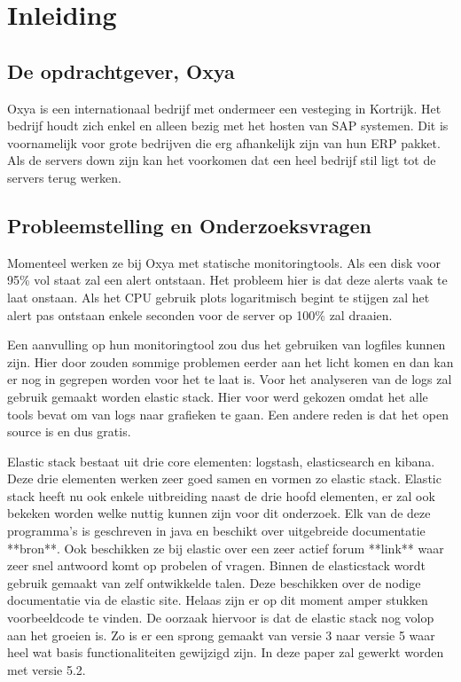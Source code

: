 
\chapter{Inleiding}
\label{ch:inleiding}


\textcite{Knuth1998}
\autocite{Creeger2009}

\section{De opdrachtgever, Oxya}
\label{sec:de-opdrachtgever}

Oxya is een internationaal bedrijf met ondermeer een vesteging in Kortrijk. Het bedrijf houdt zich enkel en alleen bezig met het hosten van SAP systemen. Dit is voornamelijk voor grote bedrijven die erg afhankelijk zijn van hun ERP pakket. Als de servers down zijn kan het voorkomen dat een heel bedrijf stil ligt tot de servers terug werken.

\section{Probleemstelling en Onderzoeksvragen}
\label{sec:onderzoeksvragen}

Momenteel werken ze bij Oxya met statische monitoringtools. Als een disk voor 95\% vol staat zal een alert ontstaan. Het probleem hier is dat deze alerts vaak te laat onstaan. Als het CPU gebruik plots logaritmisch begint te stijgen zal het alert pas ontstaan enkele seconden voor de server op 100\% zal draaien. 
 
Een aanvulling op hun monitoringtool zou dus het gebruiken van logfiles kunnen zijn. Hier door zouden sommige problemen eerder aan het licht komen en dan kan er nog in gegrepen worden voor het te laat is. Voor het analyseren van de logs zal gebruik gemaakt worden elastic stack. Hier voor werd gekozen omdat het alle tools bevat om van logs naar grafieken te gaan. Een andere reden is dat het open source is en dus gratis. 

Elastic stack bestaat uit drie core elementen: logstash, elasticsearch en kibana. Deze drie elementen werken zeer goed samen en vormen zo elastic stack. Elastic stack heeft nu ook enkele uitbreiding naast de drie hoofd elementen, er zal ook bekeken worden welke nuttig kunnen zijn voor dit onderzoek.
Elk van de deze programma's is geschreven in java en beschikt over uitgebreide documentatie **bron**. Ook beschikken ze bij elastic over een zeer actief forum **link** waar zeer snel antwoord komt op probelen of vragen. Binnen de elasticstack wordt gebruik gemaakt van zelf ontwikkelde talen. Deze beschikken over de nodige documentatie via de elastic site. Helaas zijn er op dit moment amper stukken voorbeeldcode te vinden.
De oorzaak hiervoor is dat de elastic stack nog volop aan het groeien is. Zo is er een sprong gemaakt van versie 3 naar versie 5 waar heel wat basis functionaliteiten gewijzigd zijn. In deze paper zal gewerkt worden met versie 5.2.

